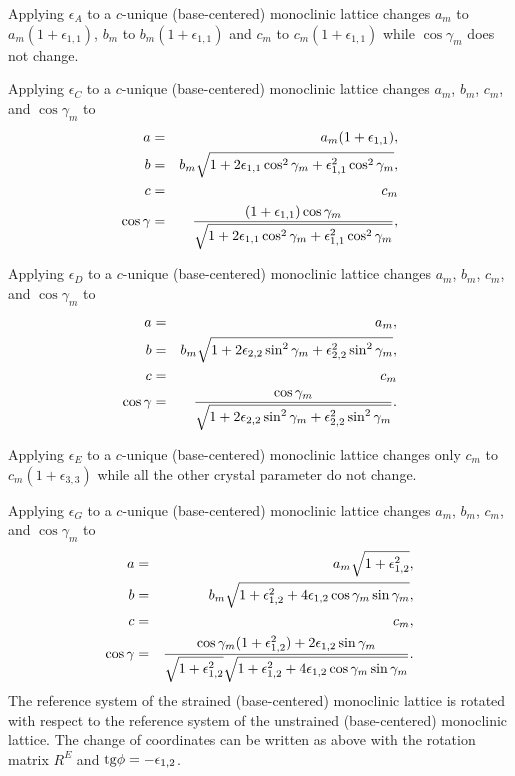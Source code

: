 \documentclass[12pt,a4paper]{article}
\begin{document}
Applying $\epsilon_A$ to a $c$-unique (base-centered) monoclinic 
lattice changes
$a_m$ to $a_m(1+\epsilon_{1,1})$, $b_m$ to $b_m(1+\epsilon_{1,1})$
and $c_m$ to $c_m(1+\epsilon_{1,1})$ while $\cos \gamma_m$
does not change.

Applying $\epsilon_C$ to a $c$-unique (base-centered) monoclinic lattice 
changes $a_m$, $b_m$, $c_m$, and $\cos \gamma_m$ to 
\begin{eqnarray}
a&=&a_m(1+\epsilon_{1,1}), \\
b&=&b_m \sqrt{1+2 \epsilon_{1,1}\cos^2\gamma_m
+\epsilon_{1,1}^2 \cos^2\gamma_m}, \\
c&=&c_m \\
\cos\gamma &=& {(1+\epsilon_{1,1}) \cos\gamma_m \over 
\sqrt{1+2 \epsilon_{1,1}\cos^2\gamma_m
+\epsilon_{1,1}^2 \cos^2\gamma_m}},
\end{eqnarray}

Applying $\epsilon_D$ to a $c$-unique (base-centered) monoclinic lattice 
changes $a_m$, $b_m$, $c_m$, and $\cos \gamma_m$ to 
\begin{eqnarray}
a&=&a_m, \\
b&=&b_m \sqrt{1+2 \epsilon_{2,2}\sin^2\gamma_m
+\epsilon_{2,2}^2 \sin^2\gamma_m}, \\
c&=&c_m \\
\cos\gamma &=& {\cos\gamma_m \over 
\sqrt{1+2 \epsilon_{2,2}\sin^2\gamma_m
+\epsilon_{2,2}^2 \sin^2\gamma_m}}.
\end{eqnarray}

Applying $\epsilon_E$ to a $c$-unique (base-centered) monoclinic 
lattice changes
only $c_m$ to $c_m(1+\epsilon_{3,3})$ while all the other crystal
parameter do not change.

Applying $\epsilon_G$ to a $c$-unique (base-centered) monoclinic lattice 
changes $a_m$, $b_m$, $c_m$, and $\cos \gamma_m$ to 
\begin{eqnarray}
a&=&a_m \sqrt{1+\epsilon_{1,2}^2}, \\
b&=&b_m \sqrt{1+\epsilon_{1,2}^2
+4\epsilon_{1,2} \cos\gamma_m \sin\gamma_m}, \\
c&=&c_m, \\
\cos\gamma &=& {\cos\gamma_m (1+\epsilon_{1,2}^2) + 2 \epsilon_{1,2} 
\sin \gamma_m \over \sqrt{1+\epsilon_{1,2}^2}
\sqrt{1+\epsilon_{1,2}^2+4\epsilon_{1,2} \cos\gamma_m \sin\gamma_m}}.
\end{eqnarray}
The reference system of the strained (base-centered) monoclinic 
lattice is rotated 
with respect to the reference system of the unstrained  
(base-centered) monoclinic lattice. 
The change of coordinates can be written as above with the rotation matrix 
$R^E$ and ${\rm tg}\phi=-\epsilon_{1,2}$.
\end{document}
